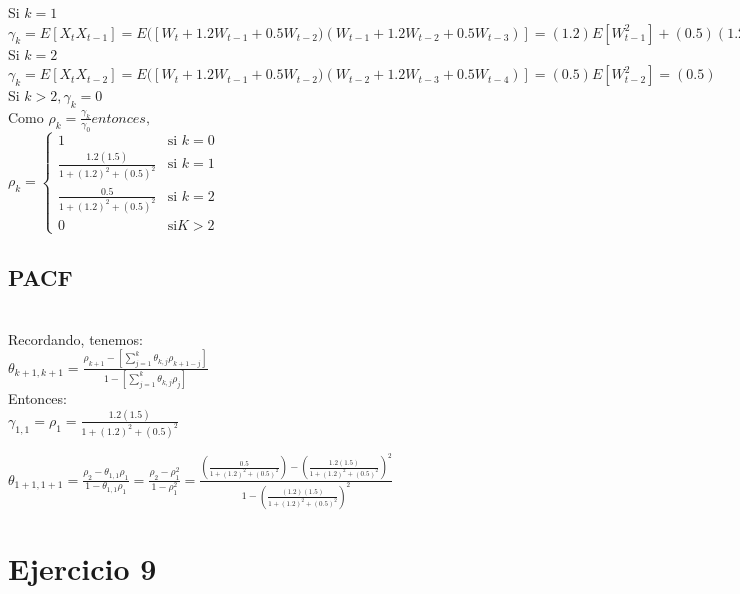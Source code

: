 \documentclass{article}
\begin{document}
Si $k =1 $ \\

$\gamma_k = E[X_t X_{t-1}] = E([W_t + 1.2 W_{t-1} + 0.5 W_{t-2})(W_{t-1} + 1.2 W_{t-2} + 0.5 W_{t-3})]= (1.2)E[W_{t-1}^2] + (0.5)(1.2)E[W_{t-2}^2] = 1.2+(1.2)(0.5)=1.2(1.5)$\\

Si $k =2 $ \\

$\gamma_k = E[X_t X_{t-2}] = E([W_t + 1.2 W_{t-1} + 0.5 W_{t-2})(W_{t-2} + 1.2 W_{t-3} + 0.5 W_{t-4})]= (0.5)E[W_{t-2}^2] = (0.5) $\\

Si $k> 2,  \gamma_k =0 $\\

Como $\rho_k = \frac{\gamma_k}{\gamma_0}  entonces, $\\

$\rho_{k} = \left\{\begin{array}{rl}  1 & \text{si } k =0  \\ \frac{1.2(1.5)}{1+(1.2)^2+(0.5)^2} & \text{si } k =1 \\  \frac{0.5}{1+(1.2)^2+(0.5)^2} & \text{si } k =2 \\  0  & \text{si}  K>2 \end{array} \right. $\\

\subsection{PACF}\\

Recordando, tenemos: \\

$\theta_{k+1,k+1} = \frac{\rho_{k+1}-[\sum_{j=1}^{k} \theta_{k,j}\rho_{k+1-j} ]}{1- [\sum_{j=1}^{k} \theta_{k,j}\rho_{j} ]}$\\

Entonces: \\

$\gamma_{1,1} = \rho_1 = \frac{1.2(1.5)}{1+(1.2)^2+(0.5)^2} $

$\theta_{1+1,1+1} = \frac{\rho_{2}-\theta_{1,1}\rho_{1} }{1-\theta_{1,1}\rho_{1}} = \frac{\rho_{2} -  \rho_{1}^2}{1-\rho_{1}^2} = \frac{(\frac{0.5}{1+(1.2)^2+(0.5)^2})-(\frac{1.2(1.5)}{1+(1.2)^2+(0.5)^2})^2}{1-(\frac{(1.2)(1.5)}{1+(1.2)^2+(0.5)^2})^2} $\\

\section{Ejercicio 9}\\
\end{document}
